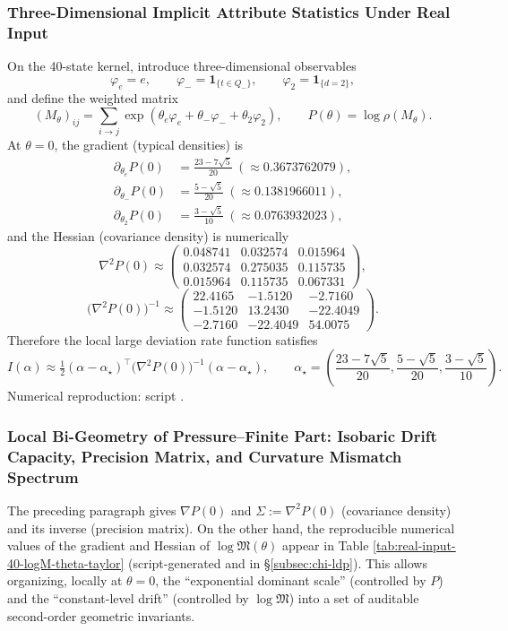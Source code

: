 \subsubsection{Three-Dimensional Implicit Attribute Statistics Under Real Input}\label{app:real-input-40-arity-3d}
On the 40-state kernel, introduce three-dimensional observables
\[
\varphi_e=e,\qquad
\varphi_-=\mathbf{1}_{\{t\in Q_-\}},\qquad
\varphi_2=\mathbf{1}_{\{d=2\}},
\]
and define the weighted matrix
\[
(M_\theta)_{ij}=\sum_{i\to j}\exp(\theta_e\varphi_e+\theta_-\varphi_-+\theta_2\varphi_2),
\qquad
P(\theta)=\log\rho(M_\theta).
\]
At $\theta=0$, the gradient (typical densities) is
\[
\begin{aligned}
\partial_{\theta_e}P(0)&=\frac{23-7\sqrt5}{20}\ (\approx 0.3673762079),\\
\partial_{\theta_-}P(0)&=\frac{5-\sqrt5}{20}\ (\approx 0.1381966011),\\
\partial_{\theta_2}P(0)&=\frac{3-\sqrt5}{10}\ (\approx 0.0763932023),
\end{aligned}
\]
and the Hessian (covariance density) is numerically
\[
\nabla^2P(0)\approx
\begin{pmatrix}
0.048741 & 0.032574 & 0.015964\\
0.032574 & 0.275035 & 0.115735\\
0.015964 & 0.115735 & 0.067331
\end{pmatrix},
\]
\[
\bigl(\nabla^2P(0)\bigr)^{-1}\approx
\begin{pmatrix}
22.4165 & -1.5120 & -2.7160\\
-1.5120 & 13.2430 & -22.4049\\
-2.7160 & -22.4049 & 54.0075
\end{pmatrix}.
\]
Therefore the local large deviation rate function satisfies
\[
I(\alpha)\approx \tfrac12(\alpha-\alpha_\star)^\top\bigl(\nabla^2P(0)\bigr)^{-1}(\alpha-\alpha_\star),
\qquad
\alpha_\star=\left(\frac{23-7\sqrt5}{20},\frac{5-\sqrt5}{20},\frac{3-\sqrt5}{10}\right).
\]
Numerical reproduction: script .

\subsubsection{Local Bi-Geometry of Pressure--Finite Part: Isobaric Drift Capacity, Precision Matrix, and Curvature Mismatch Spectrum}\label{app:real-input-40-local-bigeometry}
The preceding paragraph gives \(\nabla P(0)\) and \(\Sigma:=\nabla^2P(0)\) (covariance density) and its inverse (precision matrix). On the other hand, the reproducible numerical values of the gradient and Hessian of \(\log\mathfrak{M}(\theta)\) appear in Table \ref{tab:real-input-40-logM-theta-taylor} (script-generated and \verb|| in \S\ref{subsec:chi-ldp}).
This allows organizing, locally at \(\theta=0\), the ``exponential dominant scale'' (controlled by \(P\)) and the ``constant-level drift'' (controlled by \(\log\mathfrak{M}\)) into a set of auditable second-order geometric invariants.

